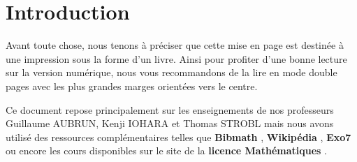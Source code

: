 \part{Introduction}
\def\arraystretch{1}

\par Avant toute chose, nous tenons à préciser que cette mise en page est destinée à une impression sous la forme d'un livre. Ainsi pour profiter d'une bonne lecture sur la version numérique, nous vous recommandons de la lire en mode \og double pages \fg avec les plus grandes marges orientées vers le centre. 
\\
\par \noindent Ce document repose principalement sur les enseignements de nos professeurs Guillaume AUBRUN, Kenji IOHARA et Thomas STROBL
mais nous avons utilisé des ressources complémentaires telles que \textbf{Bibmath} \cite{bibmath}, \textbf{Wikipédia} \cite{wikipedia}, \textbf{Exo7} \cite{exo7} ou encore les cours disponibles sur le site de la \textbf{licence Mathématiques} \cite{licence_maths}.

